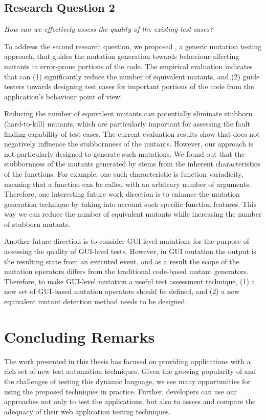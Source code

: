 \subsection{Research Question 2}

\emph{How can we effectively assess the quality of the existing \javascript test cases?}

 To address the second research question, we proposed \mutandis, a generic mutation testing approach, that guides the mutation generation towards behaviour-affecting mutants in error-prone portions of the code. The empirical evaluation indicates that \mutandis can (1) significantly reduce the number of equivalent mutants, and (2) guide testers towards designing test cases for important portions of the code from the application's behaviour point of view. 

Reducing the number of equivalent mutants can potentially eliminate stubborn (hard-to-kill) mutants, which are particularly important for assessing the fault finding capability of test cases. The current evaluation results show that \mutandis does not negatively influence the stubbornness of the mutants.
However, our approach is not particularly designed to generate such mutations.
We found out that the stubbornness of the mutants generated by \mutandis stems from the inherent characteristics of the \javascript functions. For example, one such characteristic is function variadicity, meaning that a function can be called with an arbitrary number of arguments. 
Therefore, one interesting future work direction is to enhance the mutation generation technique by taking into account such specific function features. This way we can reduce the number of equivalent mutants while increasing the number of stubborn mutants.

Another future direction is to consider GUI-level mutations for the purpose of assessing the quality of GUI-level tests. However, in GUI mutation the output is the resulting state from an executed event, and as a result the scope of the mutation operators differs from the traditional code-based mutant generators. Therefore, to make GUI-level mutation a useful test assessment technique, (1) a new set of GUI-based mutation operators should be defined, and (2) a new equivalent mutant detection method needs to be designed.
\section{Concluding Remarks}
The work presented in this thesis has focused on providing \javascript applications with a rich set of new test automation techniques. Given the growing popularity of \javascript and the challenges of testing this dynamic language, we see many opportunities for using the proposed techniques in practice. Further, developers can use our approaches not only to test the applications, but also to assess and compare the adequacy of their web application testing techniques. 
  



